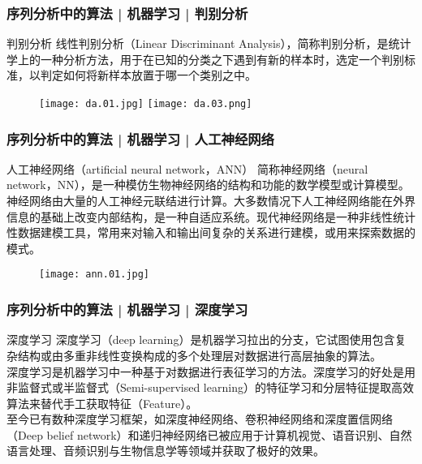 \begin{frame}
  \frametitle{序列分析中的算法 | 机器学习 | 判别分析}
  \begin{block}{判别分析}
    线性判别分析（Linear Discriminant Analysis），简称判别分析，是统计学上的一种分析方法，用于在已知的分类之下遇到有新的样本时，选定一个判别标准，以判定如何将新样本放置于哪一个类别之中。
  \end{block}
  \begin{figure}
    \centering
    \texttt{[image: da.01.jpg]}
    \texttt{[image: da.03.png]}
  \end{figure}
\end{frame}

\begin{frame}
  \frametitle{序列分析中的算法 | 机器学习 | 人工神经网络}
  \begin{block}{人工神经网络（artificial neural network，ANN）}
   简称神经网络（neural network，NN），是一种模仿生物神经网络的结构和功能的数学模型或计算模型。神经网络由大量的人工神经元联结进行计算。大多数情况下人工神经网络能在外界信息的基础上改变内部结构，是一种自适应系统。现代神经网络是一种非线性统计性数据建模工具，常用来对输入和输出间复杂的关系进行建模，或用来探索数据的模式。
  \end{block}
  \begin{figure}
    \centering
    \texttt{[image: ann.01.jpg]}
  \end{figure}
\end{frame}

\begin{frame}
  \frametitle{序列分析中的算法 | 机器学习 | 深度学习}
  \begin{block}{深度学习}
    深度学习（deep learning）是机器学习拉出的分支，它试图使用包含复杂结构或由多重非线性变换构成的多个处理层对数据进行高层抽象的算法。\\
    \vspace{0.5em}
深度学习是机器学习中一种基于对数据进行表征学习的方法。深度学习的好处是用非监督式或半监督式（Semi-supervised learning）的特征学习和分层特征提取高效算法来替代手工获取特征（Feature）。\\
    \vspace{0.5em}
至今已有数种深度学习框架，如深度神经网络、卷积神经网络和深度置信网络（Deep belief network）和递归神经网络已被应用于计算机视觉、语音识别、自然语言处理、音频识别与生物信息学等领域并获取了极好的效果。
  \end{block}
\end{frame}


